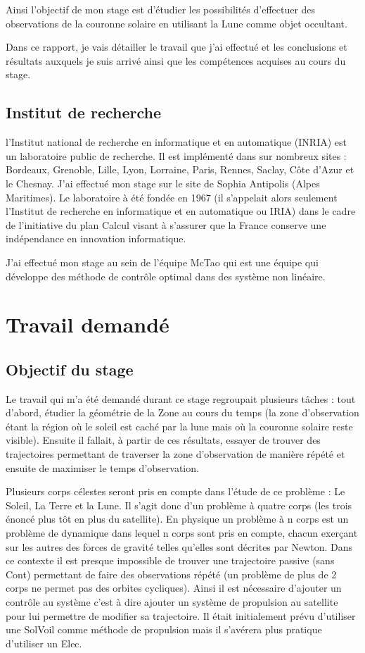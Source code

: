\documentclass[11pt]{article} %
\begin{document}
		Ainsi l'objectif de mon stage est d'étudier les possibilités d'effectuer des observations de la couronne solaire en utilisant la Lune comme objet occultant.
		 
		Dans ce rapport, je vais détailler le travail que j'ai effectué et les conclusions et résultats auxquels je suis arrivé ainsi que les compétences acquises au cours du stage. 
		 
		\subsection{Institut de recherche}
		
		l'Institut national de recherche en informatique et en automatique (INRIA) est un laboratoire public de recherche. Il est implémenté dans sur nombreux sites :  Bordeaux, Grenoble, Lille, Lyon, Lorraine, Paris, Rennes, Saclay, Côte d'Azur et le Chesnay. J'ai effectué mon stage sur le site de Sophia Antipolis (Alpes Maritimes). Le laboratoire à été fondée en 1967 (il s'appelait alors seulement l'Institut de recherche en informatique et en automatique ou IRIA) dans le cadre de l'initiative du plan Calcul visant à s'assurer que la France conserve une indépendance en innovation informatique.
		
		J'ai effectué mon stage au sein de l'équipe McTao qui est une équipe qui développe des méthode de contrôle optimal dans des système non linéaire.
		
		\section{Travail demandé}
		\subsection{Objectif du stage}
		Le travail qui m'a été demandé durant ce stage regroupait plusieurs tâches : tout d'abord, étudier la géométrie de la \gls{Zone} au cours du temps (la zone d'observation étant la région où le soleil est caché par la lune mais où la couronne solaire reste visible). Ensuite il fallait, à partir de ces résultats, essayer de trouver des trajectoires permettant de traverser la zone d'observation de manière répété et ensuite de maximiser le temps d'observation.
		
		Plusieurs corps célestes seront pris en compte dans l'étude de ce problème : Le Soleil, La Terre et la Lune. Il s'agit donc d'un problème à quatre corps (les trois énoncé plus tôt en plus du satellite). En physique un problème à n corps est un problème de dynamique dans lequel n corps sont pris en compte, chacun exerçant sur les autres des forces de gravité telles qu'elles sont décrites par Newton. Dans ce contexte il est presque impossible de trouver une trajectoire passive (sans \gls{Cont}) permettant de faire des observations répété (un problème de plus de 2 corps ne permet pas des orbites cycliques). Ainsi il est nécessaire d'ajouter un contrôle au système c'est à dire ajouter un système de propulsion au satellite pour lui permettre de modifier sa trajectoire. Il était initialement prévu d'utiliser une \gls{SolVoil} comme méthode de propulsion mais il s'avérera plus pratique d'utiliser un \gls{Elec}.
			
\end{document}
